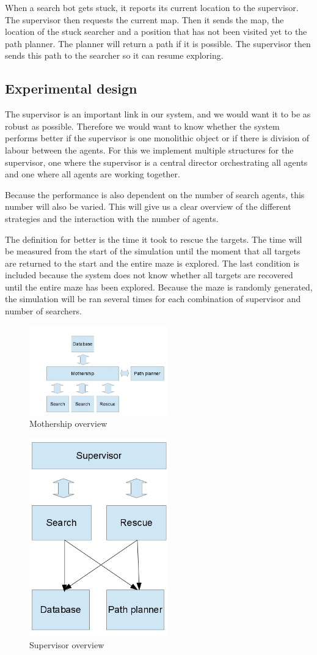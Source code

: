 When a search bot gets stuck, it reports its current location to the
supervisor. The supervisor then requests the current map. Then it sends the
map, the location of the stuck searcher and a position that has not been
visited yet to the path planner. The planner will return a path if it is
possible. The supervisor then sends this path to the searcher so it can
resume exploring.

\subsection{Experimental design}
The supervisor is an important link in our system, and we would want it to
be as robust as possible. Therefore we would want to know whether the
system performs better if the supervisor is one monolithic object or if
there is division of labour between the agents. For this we implement
multiple structures for the supervisor, one where the supervisor is a central
director orchestrating all agents and one where all agents are working together.

Because the performance is also dependent on the number of search agents, this
number will also be varied. This will give us a clear overview of the
different strategies and the interaction with the number of agents.

The definition for better is the time it took to rescue the targets.  The
time will be measured from the start of the simulation until the moment that
all targets are returned to the start and the entire maze is explored. The last
condition is included because the system does not know whether all targets
are recovered until the entire maze has been explored. Because the maze is
randomly generated, the simulation will be ran several times for each
combination of supervisor and number of searchers.


\begin{figure}[h]
	\centering
		\includegraphics[width=6cm]{mothership}
	\caption{Mothership overview}
	\label{fig:mothership}
\end{figure}

\begin{figure}[h]
	\centering
		\includegraphics[width=6cm]{supervisor}
	\caption{Supervisor overview}
	\label{fig:supervisor}
\end{figure}
